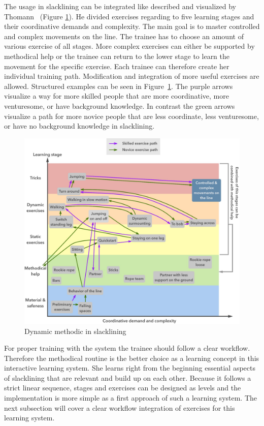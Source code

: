 The usage in slacklining can be integrated like described and visualized by Thomann~\cite{Thomann2013-aa} (Figure \ref{fig:3_3_1_dynamicMethod}). He divided exercises regarding to five learning stages and their coordinative demands and complexity. The main goal is to master controlled and complex movements on the line. The trainee has to choose an amount of various exercise of all stages. More complex exercises can either be supported by methodical help or the trainee can return to the lower stage to learn the movement for the specific exercise. Each trainee can therefore create her individual training path. Modification and integration of more useful exercises are allowed. Structured examples can be seen in Figure~\ref{fig:3_3_1_dynamicMethod}. The purple arrows visualize a way for more skilled people that are more coordinative, more venturesome, or have background knowledge. In contrast the green arrows visualize a path for more novice people that are less coordinate, less venturesome, or have no background knowledge in slacklining.
\begin{figure}[htb]
	\centering
	\begin{minipage}[t]{1\linewidth}
		\centering
		\includegraphics[width=1\linewidth]{Pictures/3_3_1_dynamicMethodBoth2}
		\caption{Dynamic methodic in slacklining~\cite{Thomann2013-aa}}
		\label{fig:3_3_1_dynamicMethod}
	\end{minipage}
\end{figure}

For proper training with the system the trainee should follow a clear workflow. Therefore the methodical routine is the better choice as a learning concept in this interactive learning system. She learns right from the beginning essential aspects of slacklining that are relevant and build up on each other. Because it follows a strict linear sequence, stages and exercises can be designed as levels and the implementation is more simple as a first approach of such a learning system. 
The next subsection \textit{} will cover a clear workflow integration of exercises for this learning system.

